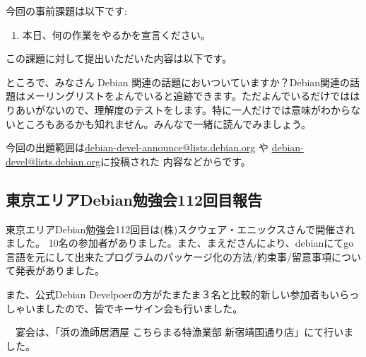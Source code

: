 \documentclass[mingoth,a4paper]{jsarticle}
\begin{document}

今回の事前課題は以下です:
\begin{enumerate}
 \item 本日、何の作業をやるかを宣言ください。
\end{enumerate}
この課題に対して提出いただいた内容は以下です。
\begin{multicols}{2}
{\small

}
\end{multicols}


ところで、みなさん Debian 関連の話題においついていますか？Debian関連の話
題はメーリングリストをよんでいると追跡できます。ただよんでいるだけではは
りあいがないので、理解度のテストをします。特に一人だけでは意味がわからな
いところもあるかも知れません。みんなで一緒に読んでみましょう。

今回の出題範囲は\url{debian-devel-announce@lists.debian.org} や \url{debian-devel@lists.debian.org}に投稿された
内容などからです。

\begin{multicols}{2}

\end{multicols}


\subsection{東京エリアDebian勉強会112回目報告}

 東京エリアDebian勉強会112回目は(株)スクウェア・エニックスさんで開催されました。
 10名の参加者がありました。また、まえださんにより、debianにてgo言語を元にして出来たプログラムのパッケージ化の方法/約束事/留意事項について発表がありました。

 また、公式Debian Develpoerの方がたまたま３名と比較的新しい参加者もいらっしゃいましたので、皆でキーサイン会も行いました。

　宴会は、「浜の漁師居酒屋 こちらまる特漁業部 新宿靖国通り店」にて行いました。


\end{document}
